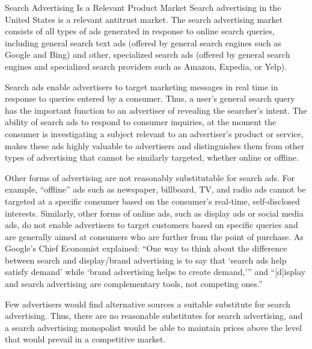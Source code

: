 \documentclass[11pt,b5paper]{scrartcl}
\begin{document}



Search Advertising Is a Relevant Product Market
Search advertising in the United States is a relevant antitrust market. The search
advertising market consists of all types of ads generated in response to online search queries,
including general search text ads (offered by general search engines such as Google and Bing)
and other, specialized search ads (offered by general search engines and specialized search
providers such as Amazon, Expedia, or Yelp).


Search ads enable advertisers to target marketing messages in real time in
response to queries entered by a consumer. Thus, a user’s general search query has the important
function to an advertiser of revealing the searcher’s intent. The ability of search ads to respond to
consumer inquiries, at the moment the consumer is investigating a subject relevant to an
advertiser’s product or service, makes these ads highly valuable to advertisers and distinguishes
them from other types of advertising that cannot be similarly targeted, whether online or offline.


Other forms of advertising are not reasonably substitutable for search ads. For
example, “offline” ads such as newspaper, billboard, TV, and radio ads cannot be targeted at a
specific consumer based on the consumer’s real-time, self-disclosed interests. Similarly, other
forms of online ads, such as display ads or social media ads, do not enable advertisers to target
customers based on specific queries and are generally aimed at consumers who are further from
the point of purchase. As Google’s Chief Economist explained: “One way to think about the
difference between search and display/brand advertising is to say that ‘search ads help satisfy
demand’ while ‘brand advertising helps to create demand,’” and “[d]isplay and search
advertising are complementary tools, not competing ones.”


Few advertisers would find alternative sources a suitable substitute for search
advertising. Thus, there are no reasonable substitutes for search advertising, and a search
advertising monopolist would be able to maintain prices above the level that would prevail in a
competitive market.

\end{document}
